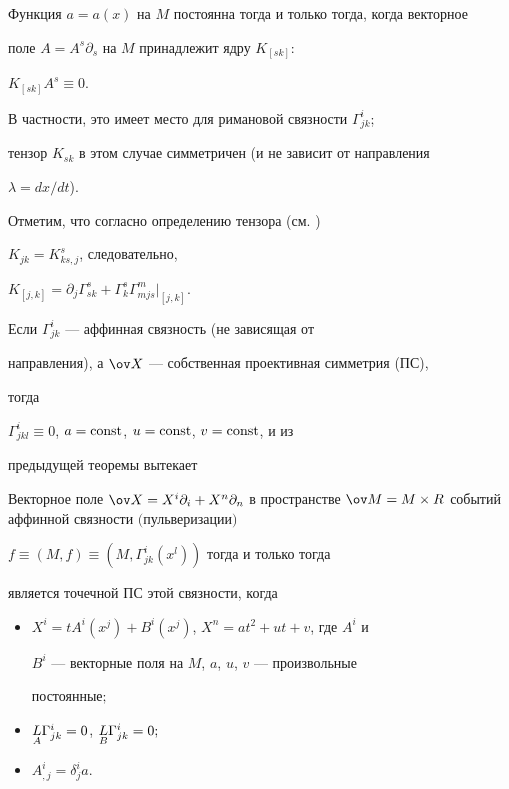  


\begin{cor} 


Функция $a=a(x)$ на $M$ постоянна тогда и только тогда, когда векторное 


поле $A=A^s\partial_s$ на $M$ принадлежит ядру $K_{[s k]}$: 


$K_{[s k]}A^s\equiv0$. 


\end{cor} 


 


В частности, это имеет место для римановой связности $\Gamma^i_{jk}$; 


тензор $K_{s k}$ в этом случае симметричен (и не зависит от направления 


$\lambda=dx/dt$). 


 


Отметим, что согласно определению тензора (см. \cite{3}) 


$K_{jk}=K^s_{k s,j}$, следовательно, 


$K_{[j,k]}= 


\partial_j\Gamma^s_{s k}+\Gamma^s_k\Gamma^m_{m j s}|_{[j,k]}$. 


 


Если $\Gamma^i_{jk}$ --- аффинная связность (не зависящая от 


направления), а $\ov X$ --- собственная проективная симметрия (ПС), 


тогда 


$\Gamma^i_{j k l}\equiv0$, $a=\operatorname{const}$, $u=\operatorname{const}$, $v=\operatorname{const}$, и из 


предыдущей теоремы вытекает 


 


\begin{thm} 


Векторное поле $\ov X=X^i\partial_i+X^n\partial_n$ в пространстве $\ov 


M=M\times R$ событий аффинной связности $($пульверизации$)$ 


$f\equiv(M,f)\equiv(M,\Gamma^i_{jk}(x^l))$ тогда и только тогда 


является точечной ПС этой связности, когда 


\begin{itemize} 


\item[1)] $X^i=t A^i(x^j)+B^i(x^j)$, $X^n=at^2+u t+v$, где $A^i$ и 


$B^i$ --- векторные поля на $M$, $a$, $u$, $v$ --- произвольные 


постоянные$;$ 


\item[2)] $\underset{A}{L}{}\Gamma^i_{jk}=0$, $\underset{B}{L}{}\Gamma^i_{jk}=0;$ 


\item[3)] $A^i_{,j}=\delta^i_j a$. 


\end{itemize} 


\end{thm} 


